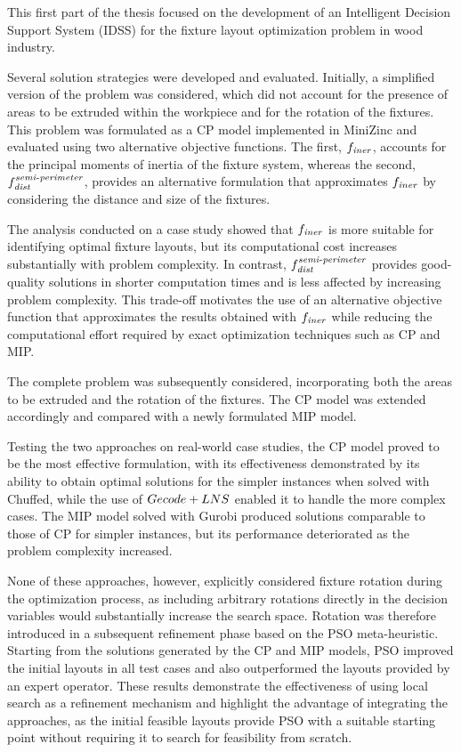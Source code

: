 \label{chap:pt1_conclusion}

This first part of the thesis focused on the development of an Intelligent Decision Support System (IDSS) for the fixture layout optimization problem in wood industry.

Several solution strategies were developed and evaluated. Initially, a simplified version of the problem was considered, which did not account for the presence of areas to be extruded within the workpiece and for the rotation of the fixtures. This problem was formulated as a CP model implemented in MiniZinc and evaluated using two alternative objective functions. The first, $f_\mathit{iner}$, accounts for the principal moments of inertia of the fixture system, whereas the second, $f_{\mathit{dist}}^{\mathit{semi\text{-}perimeter}}$, provides an alternative formulation that approximates $f_\mathit{iner}$ by considering the distance and size of the fixtures.

The analysis conducted on a case study showed that $f_\mathit{iner}$ is more suitable for identifying optimal fixture layouts, but its computational cost increases substantially with problem complexity. In contrast, $f_{\mathit{dist}}^{\mathit{semi\text{-}perimeter}}$ provides good-quality solutions in shorter computation times and is less affected by increasing problem complexity. This trade-off motivates the use of an alternative objective function that approximates the results obtained with $f_\mathit{iner}$ while reducing the computational effort required by exact optimization techniques such as CP and MIP.

The complete problem was subsequently considered, incorporating both the areas to be extruded and the rotation of the fixtures. The CP model was extended accordingly and compared with a newly formulated MIP model. 

Testing the two approaches on real-world case studies, the CP model proved to be the most effective formulation, with its effectiveness demonstrated by its ability to obtain optimal solutions for the simpler instances when solved with Chuffed, while the use of $Gecode+LNS$ enabled it to handle the more complex cases. The MIP model solved with Gurobi produced solutions comparable to those of CP for simpler instances, but its performance deteriorated as the problem complexity increased.

None of these approaches, however, explicitly considered fixture rotation during the optimization process, as including arbitrary rotations directly in the decision variables would substantially increase the search space. Rotation was therefore introduced in a subsequent refinement phase based on the PSO meta-heuristic. Starting from the solutions generated by the CP and MIP models, PSO improved the initial layouts in all test cases and also outperformed the layouts provided by an expert operator. These results demonstrate the effectiveness of using local search as a refinement mechanism and highlight the advantage of integrating the approaches, as the initial feasible layouts provide PSO with a suitable starting point without requiring it to search for feasibility from scratch.

